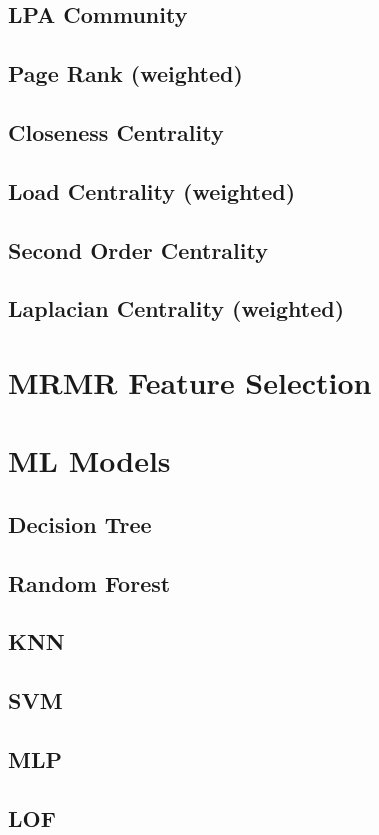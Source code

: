 \documentclass{article}
\begin{document}
\subsection{LPA Community}

\subsection{Page Rank (weighted)}

\subsection{Closeness Centrality}
\subsection{Load Centrality (weighted)}
\subsection{Second Order Centrality}
\subsection{Laplacian Centrality (weighted)}
\section{MRMR Feature Selection}
\section{ML Models}
\subsection{Decision Tree}
\subsection{Random Forest}
\subsection{KNN}
\subsection{SVM}
\subsection{MLP}
\subsection{LOF}
\end{document}
